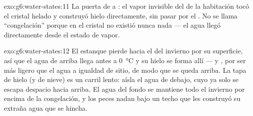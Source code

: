\begin{solution}{exo:g6:water-states:11}
La puerta de  a : el vapor invisible del  de la
habitación tocó el cristal helado y construyó hielo directamente, sin
pasar por el . No se llama ``congelación'' porque en el
cristal no existió nunca nada  --- el agua llegó
directamente desde el estado de vapor.
\end{solution}

\begin{solution}{exo:g6:water-states:12}
El estanque pierde  hacia el  del invierno por su
superficie, así que el agua de arriba llega antes a \qty{0}{\celsius}
y su hielo se forma allí --- y , por ser más ligero que el
agua a igualdad de sitio, de modo que se queda arriba. La tapa de
hielo (y de nieve) es un carril lento: aísla el agua de debajo, cuyo
 ya solo se escapa despacio hacia arriba. El agua del fondo se
mantiene todo el invierno por encima de la congelación, y los peces
nadan bajo un techo que les construyó su extraña agua que se hincha.
\end{solution}


